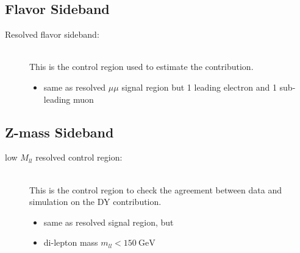 \subsection{Flavor Sideband}

\begin{description}
\item[Resolved flavor sideband:]\ \\  This is the control region used to estimate the \ttbar contribution.
  \begin{itemize}
  \item same as resolved $\mu\mu$ signal region but 1 leading electron and 1 sub-leading muon
  \end{itemize}
\end{description}

\subsection{Z-mass Sideband}

\begin{description}
\item[low $M_{ll}$ resolved control region:]\ \\ This is the control region to check the agreement between data and simulation on the DY contribution.
  \begin{itemize}
  \item same as resolved signal region, but
  \item di-lepton mass $m_{ll} < \SI{150}{\GeV}$
  \end{itemize}
\end{description}

